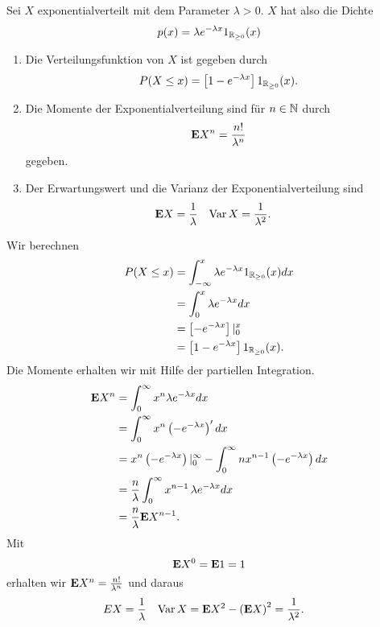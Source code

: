 Sei $X$ exponentialverteilt mit dem Parameter $\lambda>0$. $X$ hat also die Dichte
\begin{equation*}
    p(x) = \lambda e^{-\lambda x } 1_{\mathbb R_{\geq 0}}(x)
\end{equation*}
\begin{enumerate}
    \item Die Verteilungsfunktion von $X$ ist gegeben durch
        \begin{equation*}
            P( X \leq x) = \left[ 1 - e^{-\lambda x} \right] 1_{\mathbb R_{\geq 0}}(x).
        \end{equation*}
    \item Die Momente der Exponentialverteilung sind für $n\in\mathbb N$ durch
        \begin{equation*}
            \mathbf{E} X^n = \frac{n!}{\lambda^{n}}
        \end{equation*}
        gegeben. 
    \item Der Erwartungswert und die Varianz der Exponentialverteilung sind
        \begin{align*}
            \mathbf{E} X    & = \frac{1}{\lambda} & 
            \operatorname{Var} X  & = \frac{1}{\lambda^2}.
        \end{align*}
\end{enumerate}
\solution 
Wir berechnen
\begin{align*}
    P(X \leq x) & = 
    \int_{-\infty}^{x} \lambda e^{-\lambda x } 1_{\mathbb R_{\geq 0}}(x) dx \\
    &= \int_{0}^{x} \lambda e^{-\lambda x } dx \\
    &= \left[  - e^{-\lambda x}  \right] |_{0}^{x} \\
    &= \left[ 1 - e^{-\lambda x} \right] 1_{\mathbb R_{\geq 0}}(x).
\end{align*}
Die Momente erhalten wir mit Hilfe der partiellen Integration. 
\begin{align*}
    \mathbf{E} X^n &= \int_{0}^{\infty} x^n \lambda e^{- \lambda x} dx \\
    &= \int_{0}^{\infty} x^n\left( -e^{-\lambda x} \right)' dx \\
    &= x^n \left( - e^{-\lambda x} \right)|_{0}^{\infty} 
    - \int_{0}^{\infty} n x^{n-1} \left( -e^{-\lambda x} \right) dx  \\
    &= \frac{n}{\lambda} \int_{0}^{\infty} x^{n-1}\, \lambda e^{-\lambda x} dx \\
    & = \frac{n}{\lambda} \mathbf{E} X^{n-1}.
\end{align*}
Mit
\begin{equation*}
    \mathbf{E} X^{0} = \mathbf{E} 1 = 1
\end{equation*}
erhalten wir $\mathbf{E} X^n = \frac{n!}{\lambda^n}$ und daraus 
\begin{align*}
    E X &= \frac{1}{\lambda} &   \operatorname{Var} X &= \mathbf{E} X^2 - \left( \mathbf{E} X \right)^2 = 
    \frac{1}{\lambda^2}. 
\end{align*}


